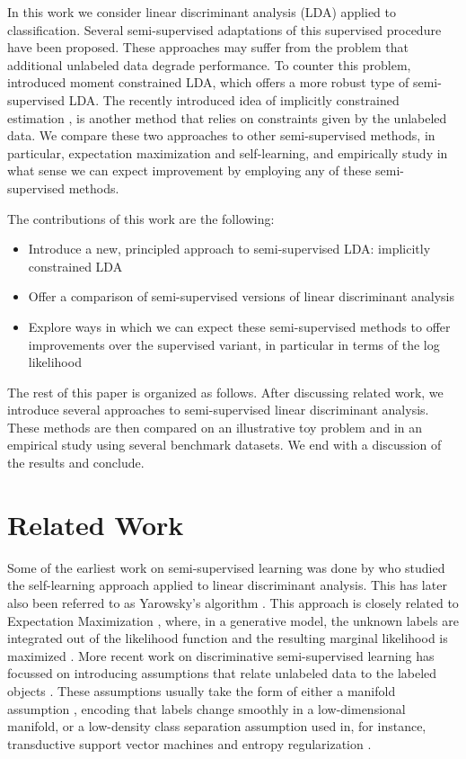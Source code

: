 In this work we consider linear discriminant analysis (LDA) applied to classification. Several semi-supervised adaptations of this supervised procedure have been proposed. These approaches may suffer from the problem that additional unlabeled data degrade performance. To counter this problem, \cite{Loog2014a} introduced moment constrained LDA, which offers a more robust type of semi-supervised LDA. The recently introduced idea of implicitly constrained estimation \cite{Krijthe2015}, is another method that relies on constraints given by the unlabeled data. We compare these two approaches to other semi-supervised methods, in particular, expectation maximization and self-learning, and empirically study in what sense we can expect improvement by employing any of these semi-supervised methods.

The contributions of this work are the following:

\begin{itemize}
  \item Introduce a new, principled approach to semi-supervised LDA: implicitly constrained LDA
  \item Offer a comparison of semi-supervised versions of linear discriminant analysis
  \item Explore ways in which we can expect these semi-supervised methods to offer improvements over the supervised variant, in particular in terms of the log likelihood
\end{itemize}

The rest of this paper is organized as follows. After discussing related work, we introduce several approaches to semi-supervised linear discriminant analysis. These methods are then compared on an illustrative toy problem and in an empirical study using several benchmark datasets. We end with a discussion of the results and conclude.

\section{Related Work}
Some of the earliest work on semi-supervised learning was done by \cite{McLachlan1975,McLachlan1977} who studied the self-learning approach applied to linear discriminant analysis. This has later also been referred to as Yarowsky's algorithm \cite{Yarowsky1995}. This approach is closely related to Expectation Maximization \cite{Abney2004}, where, in a generative model, the unknown labels are integrated out of the likelihood function and the resulting marginal likelihood is maximized \cite{Dempster1977}. More recent work on discriminative semi-supervised learning has focussed on introducing assumptions that relate unlabeled data to the labeled objects \cite{Chapelle2006}. These assumptions usually take the form of either a manifold assumption \cite{Zhu2003}, encoding that labels change smoothly in a low-dimensional manifold, or a low-density class separation assumption used in, for instance, transductive support vector machines \cite{Bennett1998,Joachims1999} and entropy regularization \cite{Grandvalet2005}. 

